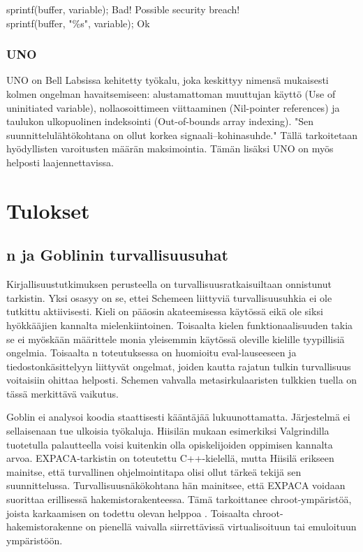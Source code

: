 sprintf(buffer, variable); Bad! Possible security breach!\\
sprintf(buffer, "\%s", variable); Ok

\subsubsection{UNO}

UNO on Bell Labsissa kehitetty työkalu, joka keskittyy nimensä mukaisesti kolmen
ongelman havaitsemiseen: alustamattoman muuttujan käyttö (Use of uninitiated
variable), nollaosoittimeen viittaaminen (Nil-pointer references) ja taulukon
ulkopuolinen indeksointi (Out-of-bounds array indexing). "Sen
suunnittelulähtökohtana on ollut korkea signaali--kohinasuhde." Tällä
tarkoitetaan hyödyllisten varoitusten määrän maksimointia.
Tämän lisäksi UNO on myös helposti laajennettavissa.
\citep{tevis2004methods} \citep{uno}


\section{Tulokset}
\label{sec:tulos}

\subsection{\scmrobo n ja Goblinin turvallisuusuhat}

Kirjallisuustutkimuksen perusteella {\scmrobo} on turvallisuusratkaisuiltaan
onnistunut tarkistin. Yksi osasyy on se, ettei Schemeen liittyviä
turvallisuusuhkia ei ole tutkittu aktiivisesti. Kieli on pääosin
akateemisessa käytössä eikä ole siksi hyökkääjien kannalta mielenkiintoinen.
Toisaalta kielen funktionaalisuuden takia se ei myöskään määrittele monia
yleisemmin käytössä oleville kielille tyypillisiä ongelmia.
Toisaalta \scmrobo n toteutuksessa on huomioitu
eval-lauseeseen ja tiedostonkäsittelyyn liittyvät ongelmat, joiden kautta
rajatun tulkin turvallisuus voitaisiin ohittaa helposti. Schemen vahvalla
metasirkulaaristen tulkkien tuella on tässä merkittävä vaikutus.

Goblin ei analysoi koodia staattisesti kääntäjää lukuunottamatta. Järjestelmä ei
sellaisenaan tue ulkoisia työkaluja. Hiisilän mukaan esimerkiksi Valgrindilla
tuotetulla palautteella voisi kuitenkin olla opiskelijoiden oppimisen kannalta
arvoa. EXPACA-tarkistin on toteutettu C++-kielellä, mutta Hiisilä erikseen
mainitse, että turvallinen ohjelmointitapa olisi ollut tärkeä tekijä sen
suunnittelussa. Turvallisuusnäkökohtana hän mainitsee, että EXPACA voidaan
suorittaa erillisessä hakemistorakenteessa. \citep{Hiisila2005} Tämä
tarkoittanee chroot-ympäristöä, joista karkaamisen on todettu olevan helppoa
\citep{Simes}. Toisaalta chroot-hakemistorakenne on pienellä vaivalla
siirrettävissä virtualisoituun tai emuloituun ympäristöön. 


